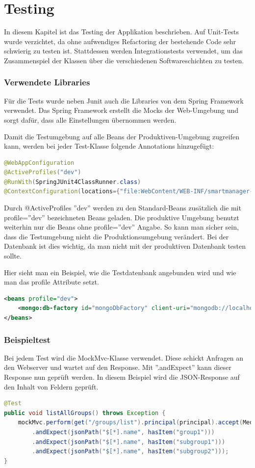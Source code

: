 \newpage
\section{Testing}
In diesem Kapitel ist das Testing der Applikation beschrieben. Auf Unit-Tests wurde verzichtet, da ohne aufwendiges Refactoring der bestehende Code sehr schwierig zu testen ist. Stattdessen werden Integrationstests verwendet, um das Zusammenspiel der Klassen über die verschiedenen Softwareschichten zu testen.

\subsubsection{Verwendete Libraries}
Für die Tests wurde neben Junit auch die Libraries von dem Spring Framework verwendet. Das Spring Framework erstellt die Mocks der Web-Umgebung und sorgt dafür, dass alle Einstellungen übernommen werden.

Damit die Testumgebung auf alle Beans der Produktiven-Umgebung zugreifen kann, werden bei jeder Test-Klasse folgende Annotations hinzugefügt:
\begin{lstlisting}[language=java]
@WebAppConfiguration
@ActiveProfiles("dev")
@RunWith(SpringJUnit4ClassRunner.class)
@ContextConfiguration(locations={"file:WebContent/WEB-INF/smartmanager-servlet.xml"})
\end{lstlisting}

Durch @ActiveProfiles ''dev'' werden zu den Standard-Beans zusätzlich die mit profile=''dev'' bezeichneten Beans geladen. Die produktive Umgebung benutzt weiterhin nur die Beans ohne profile=''dev'' Angabe. So kann man sicher sein, dass die Testumgebung nicht die Produktionsumgebung verändert. Bei der Datenbank ist dies wichtig, da man nicht mit der produktiven Datenbank testen sollte.

Hier sieht man ein Beispiel, wie die Testdatenbank angebunden wird und wie man das profile Attribute setzt.
\begin{lstlisting}[language=xml]
<beans profile="dev">
	<mongo:db-factory id="mongoDbFactory" client-uri="mongodb://localhost/test" />
</beans>
\end{lstlisting}

\subsubsection{Beispieltest}
Bei jedem Test wird die MockMvc-Klasse verwendet. Diese schickt Anfragen an den Webserver und wartet auf den Response. Mit ''.andExpect'' kann dieser Response nun geprüft werden. In diesem Beispiel wird die JSON-Response auf den Inhalt von Feldern geprüft.
\begin{lstlisting}[language=java]
@Test
public void listAllGroups() throws Exception {
	mockMvc.perform(get("/groups/list").principal(principal).accept(MediaType.APPLICATION_JSON))
		.andExpect(jsonPath("$[*].name", hasItem("group1")))
		.andExpect(jsonPath("$[*].name", hasItem("subgroup1")))
		.andExpect(jsonPath("$[*].name", hasItem("subgroup2")));
}
\end{lstlisting}

